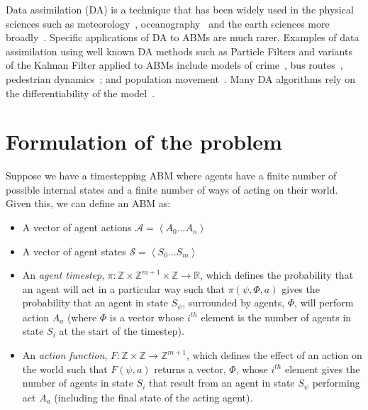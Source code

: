 \documentclass{article}
\begin{document}
Data assimilation (DA) is a technique that has been widely used in the physical sciences such as meteorology~\cite{kalnay_atmospheric_2003}, oceanography~\cite{bertino_sequential_2003} and the earth sciences more broadly~\cite{reichle_data_2008}. Specific applications of DA to ABMs are much rarer. Examples of data assimilation using well known DA methods such as Particle Filters and variants of the Kalman Filter applied to ABMs include models of crime~\cite{lloyd_exploring_2016}, bus routes~\cite{kieu_dealing_2020}, pedestrian dynamics~\cite{wang_data_2015, ward_dynamic_2016, clay_realtime_2020, malleson_simulating_2020};
and population movement~\cite{lueck_who_2019}. Many DA algorithms rely on the differentiability of the model~\cite{lewis_dynamic_2006}.

\section{Formulation of the problem}


Suppose we have a timestepping ABM where agents have a finite number of possible internal states and a finite number of ways of acting on their world. Given this, we can define an ABM as:
\begin{itemize}
	\item A vector of agent actions $\mathcal{A} =\left< A_0 ... A_n \right>$
	
	\item A vector of agent states $\mathcal{S} = \left<S_0 ... S_m\right>$
	
	\item An \textit{agent timestep}, $\pi : \mathbb{Z}\times\mathbb{Z}^{m+1}\times\mathbb{Z} \to \mathbb{R}$, which defines the probability that an agent will act in a particular way such that $\pi(\psi,\Phi,a)$ gives the probability that an agent in state $S_\psi$, surrounded by agents, $\Phi$, will perform action $A_a$ (where $\Phi$ is a vector whose $i^{th}$ element is the number of agents in state $S_i$ at the start of the timestep).
	
	\item An \textit{action function}, $F: \mathbb{Z} \times \mathbb{Z} \to \mathbb{Z}^{m+1}$, which defines the effect of an action on the world such that $F(\psi, a)$ returns a vector, $\Phi$, whose $i^{th}$ element gives the number of agents in state $S_i$ that result from an agent in state $S_\psi$ performing act $A_a$ (including the final state of the acting agent).
\end{itemize}
\end{document}
